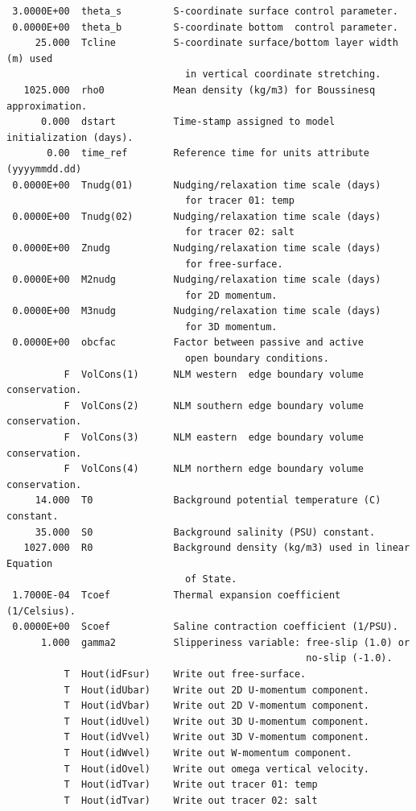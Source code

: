 \begin{verbatim}
 3.0000E+00  theta_s         S-coordinate surface control parameter.
 0.0000E+00  theta_b         S-coordinate bottom  control parameter.
     25.000  Tcline          S-coordinate surface/bottom layer width (m) used
                               in vertical coordinate stretching.
   1025.000  rho0            Mean density (kg/m3) for Boussinesq approximation.
      0.000  dstart          Time-stamp assigned to model initialization (days).
       0.00  time_ref        Reference time for units attribute (yyyymmdd.dd)
 0.0000E+00  Tnudg(01)       Nudging/relaxation time scale (days)
                               for tracer 01: temp
 0.0000E+00  Tnudg(02)       Nudging/relaxation time scale (days)
                               for tracer 02: salt
 0.0000E+00  Znudg           Nudging/relaxation time scale (days)
                               for free-surface.
 0.0000E+00  M2nudg          Nudging/relaxation time scale (days)
                               for 2D momentum.
 0.0000E+00  M3nudg          Nudging/relaxation time scale (days)
                               for 3D momentum.
 0.0000E+00  obcfac          Factor between passive and active
                               open boundary conditions.
          F  VolCons(1)      NLM western  edge boundary volume conservation.
          F  VolCons(2)      NLM southern edge boundary volume conservation.
          F  VolCons(3)      NLM eastern  edge boundary volume conservation.
          F  VolCons(4)      NLM northern edge boundary volume conservation.
     14.000  T0              Background potential temperature (C) constant.
     35.000  S0              Background salinity (PSU) constant.
   1027.000  R0              Background density (kg/m3) used in linear Equation
                               of State.
 1.7000E-04  Tcoef           Thermal expansion coefficient (1/Celsius).
 0.0000E+00  Scoef           Saline contraction coefficient (1/PSU).
      1.000  gamma2          Slipperiness variable: free-slip (1.0) or 
                                                    no-slip (-1.0).
          T  Hout(idFsur)    Write out free-surface.
          T  Hout(idUbar)    Write out 2D U-momentum component.
          T  Hout(idVbar)    Write out 2D V-momentum component.
          T  Hout(idUvel)    Write out 3D U-momentum component.
          T  Hout(idVvel)    Write out 3D V-momentum component.
          T  Hout(idWvel)    Write out W-momentum component.
          T  Hout(idOvel)    Write out omega vertical velocity.
          T  Hout(idTvar)    Write out tracer 01: temp
          T  Hout(idTvar)    Write out tracer 02: salt


\end{verbatim}
